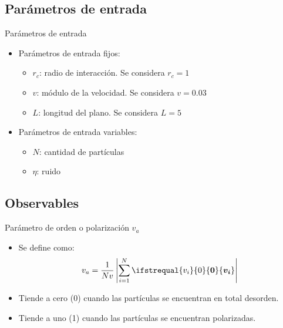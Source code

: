 \documentclass{beamer}
\renewcommand\vec[1]{\ifstrequal{#1}{0}{\ensuremath{\mathbf{0}}}{\ensuremath{\boldsymbol{#1}}}}
\begin{document}
        \subsection{Parámetros de entrada}

            \begin{frame}{Parámetros de entrada}
                \begin{itemize}
                    \item Parámetros de entrada fijos:
                    \begin{itemize}
                        \item $r_c$: radio de interacción. \alert{Se considera $r_c=1$}
                        \item $v$: módulo de la velocidad. \alert{Se considera $v=0.03$}
                        \item $L$: longitud del plano. \alert{Se considera $L=5$}
                    \end{itemize}
                    \item Parámetros de entrada variables:
                    \begin{itemize}
                        \item $N$: cantidad de partículas
                        \item $\eta$: ruido
                    \end{itemize}
                \end{itemize}
            \end{frame}

        \subsection{Observables}

            \begin{frame}{Parámetro de orden o polarización $v_a$}
                \begin{itemize}
                    \item Se define como:
                    \begin{equation*}
                        v_a = \frac{1}{Nv} \left|\sum_{i=1}^{N} \vec{v_i} \right|
                    \end{equation*}
                    \item Tiende a cero (0) cuando las partículas se encuentran en total desorden.
                    \item Tiende a uno (1) cuando las partículas se encuentran polarizadas.
                \end{itemize}
            \end{frame}
\end{document}
